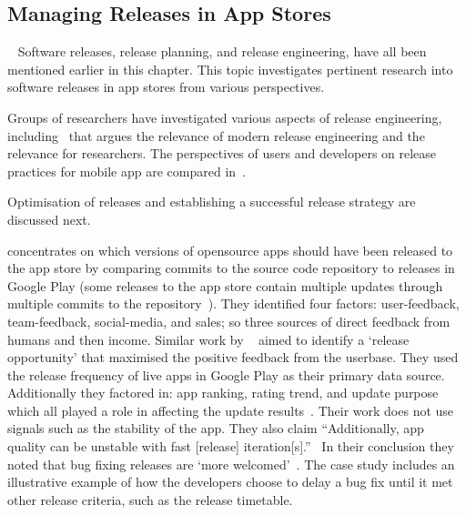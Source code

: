 \subsection{Managing Releases in App Stores}~\label{rw-managing-releases-in-app-stores-topic}
Software releases, release planning, and release engineering, have all been mentioned earlier in this chapter. This topic investigates pertinent research into software releases in app stores from various perspectives.

Groups of researchers have investigated various aspects of release engineering, including~ that argues the relevance of modern release engineering and the relevance for researchers. The perspectives of users and developers on release practices for mobile app are compared in~.

Optimisation of releases and establishing a successful release strategy are discussed next. 

 concentrates on which versions of opensource apps should have been released to the app store by comparing commits to the source code repository to releases in Google Play (some releases to the app store contain multiple updates through multiple commits to the repository~). They identified four factors: user-feedback, team-feedback, social-media, and sales; so three sources of direct feedback from humans and then income. Similar work by ~ aimed to identify a `release opportunity' that maximised the positive feedback from the userbase. They used the release frequency of live apps in Google Play as their primary data source. Additionally they factored in: app ranking, rating trend, and update purpose which all played a role in affecting the update results~. Their work does not use signals such as the stability of the app. They also claim ``Additionally, app quality can be unstable with fast [release] iteration[s].''~ In their conclusion they noted that bug fixing releases are `more welcomed'~. The  case study includes an illustrative example of how the developers choose to delay a bug fix until it met other release criteria, such as the release timetable. %


